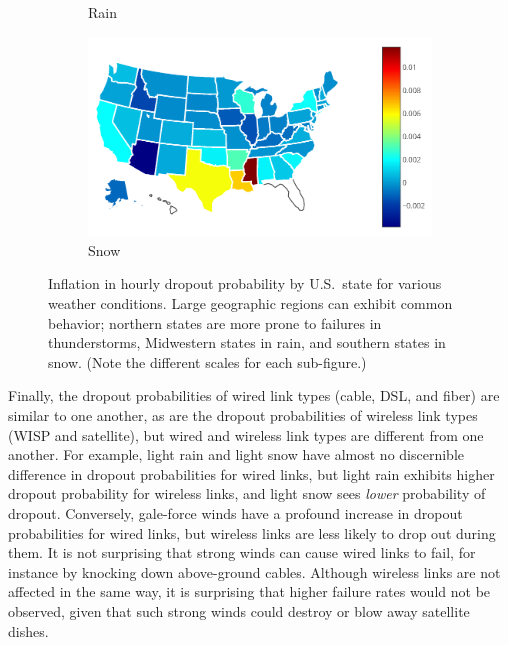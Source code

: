 \begin{figure}[t]
\begin{subfigure}[t]{0.32\linewidth}
\caption{
\label{fig:inflatedfrate_rain_usmap}
	Rain}
\end{subfigure}
%
\begin{subfigure}[t]{0.32\linewidth}
\centering
\includegraphics[width=\linewidth]{weather/figs/normalizedfratebyexclweather_ALL_issnow_statewise_jan11todec17_heatmap}
\caption{
\label{fig:inflatedfrate_snow_usmap}
	Snow}
\end{subfigure}
%
\caption{
\label{fig:inflatedfrate_maps}
\figdone
Inflation in hourly dropout probability by U.S.~state for various
	weather conditions.  Large geographic regions can exhibit common
	behavior; northern states are more prone to failures in
	thunderstorms, Midwestern states in rain, and southern states in
	snow.  (Note the different scales for each sub-figure.)}
\end{figure}


Finally, the dropout probabilities of wired link types (cable, DSL, and
fiber) are similar to one another, as are the dropout probabilities of
wireless link types (WISP and satellite), but wired and wireless link
types are different from one another.
%
For example, light rain and light snow have almost no discernible
difference in dropout probabilities for wired links, but light rain
exhibits higher dropout probability for wireless links, and light snow
sees \emph{lower} probability of dropout.
%
Conversely, gale-force winds have a profound increase in dropout
probabilities for wired links, but wireless links are less likely to
drop out during them.
%
It is not surprising that strong winds can cause wired links to fail,
for instance by knocking down above-ground cables.
%
Although wireless links are not affected in the same way, it is
surprising that higher failure rates would not be observed, given that
such strong winds could destroy or blow away satellite dishes.


